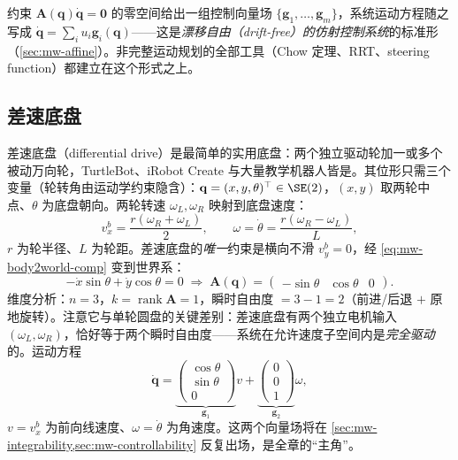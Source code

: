 \begin{insight}\label{ins:mw-vf}
约束 $\mathbf{A}(\mathbf{q})\dot{\mathbf{q}}=\mathbf{0}$ 的零空间给出一组控制向量场 $\{\mathbf{g}_1,\dots,\mathbf{g}_m\}$，系统运动方程随之写成 $\dot{\mathbf{q}}=\sum_i u_i\mathbf{g}_i(\mathbf{q})$——这是\emph{漂移自由（drift-free）的仿射控制系统}的标准形（\cref{sec:mw-affine}）。非完整运动规划的全部工具（Chow 定理、RRT、steering function）都建立在这个形式之上。
\end{insight}

\subsection{差速底盘}
\label{sec:mw-diff}

差速底盘（differential drive）是最简单的实用底盘：两个独立驱动轮加一或多个被动万向轮，TurtleBot、iRobot Create 与大量教学机器人皆是。其位形只需三个变量（轮转角由运动学约束隐含）：$\mathbf{q}=(x,y,\theta)^\top\in\SE(2)$，$(x,y)$ 取两轮中点、$\theta$ 为底盘朝向。两轮转速 $\omega_L,\omega_R$ 映射到底盘速度：
\begin{equation}
  v_x^b=\frac{r(\omega_R+\omega_L)}{2},\qquad \omega=\dot\theta=\frac{r(\omega_R-\omega_L)}{L},
  \label{eq:mw-diff-fk}
\end{equation}
$r$ 为轮半径、$L$ 为轮距。差速底盘的\emph{唯一}约束是横向不滑 $v_y^b=0$，经 \cref{eq:mw-body2world-comp} 变到世界系：
\begin{equation}
  -\dot x\sin\theta+\dot y\cos\theta=0
  \;\Longrightarrow\;
  \mathbf{A}(\mathbf{q})=\begin{pmatrix}-\sin\theta&\cos\theta&0\end{pmatrix}.
  \label{eq:mw-diff-A}
\end{equation}
维度分析：$n=3$，$k=\operatorname{rank}\mathbf{A}=1$，瞬时自由度 $=3-1=2$（前进/后退 $+$ 原地旋转）。注意它与单轮圆盘的关键差别：差速底盘有两个独立电机输入 $(\omega_L,\omega_R)$，恰好等于两个瞬时自由度——系统在允许速度子空间内是\emph{完全驱动}的。运动方程
\begin{equation}
  \dot{\mathbf{q}}=\underbrace{\begin{pmatrix}\cos\theta\\\sin\theta\\0\end{pmatrix}}_{\mathbf{g}_1}v
  +\underbrace{\begin{pmatrix}0\\0\\1\end{pmatrix}}_{\mathbf{g}_2}\omega,
  \label{eq:mw-diff-vf}
\end{equation}
$v=v_x^b$ 为前向线速度、$\omega=\dot\theta$ 为角速度。这两个向量场将在 \cref{sec:mw-integrability,sec:mw-controllability} 反复出场，是全章的“主角”。

